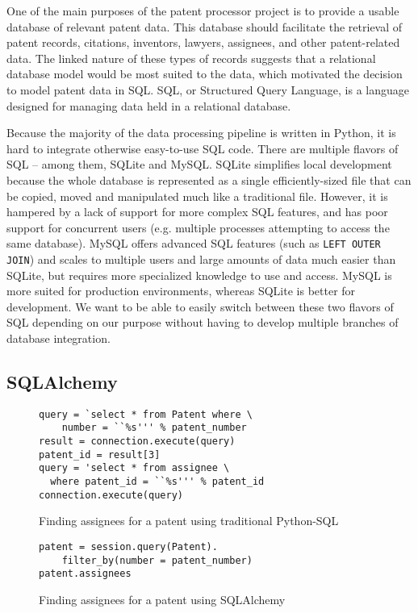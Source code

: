 One of the main purposes of the patent processor project is to provide
a usable database of relevant patent data. This database should facilitate
the retrieval of patent records, citations, inventors, lawyers, assignees,
and other patent-related data. The linked nature of these types of
records suggests that a relational database model would be most suited
to the data, which motivated the decision to model patent data in
SQL. SQL, or Structured Query Language, is a language designed for
managing data held in a relational database.

Because the majority of the data processing pipeline is written in
Python, it is hard to integrate otherwise easy-to-use SQL code. There
are multiple flavors of SQL -- among them, SQLite and MySQL. SQLite
simplifies local development because the whole database is represented
as a single efficiently-sized file that can be copied, moved and manipulated
much like a traditional file. However, it is hampered by a lack of
support for more complex SQL features, and has poor support for concurrent
users (e.g. multiple processes attempting to access the same database).
MySQL offers advanced SQL features (such as \verb`LEFT OUTER JOIN`)
and scales to multiple users and large amounts of data much easier
than SQLite, but requires more specialized knowledge to use and access.
MySQL is more suited for production environments, whereas SQLite is
better for development. We want to be able to easily switch between
these two flavors of SQL depending on our purpose without having to
develop multiple branches of database integration.


\subsection{SQLAlchemy}

\begin{figure*}
\begin{lstlisting}
query = `select * from Patent where \
    number = ``%s''' % patent_number
result = connection.execute(query)
patent_id = result[3]
query = 'select * from assignee \
  where patent_id = ``%s''' % patent_id
connection.execute(query)
\end{lstlisting}
 \label{fig:sql-assignee} \caption{Finding assignees for a patent using traditional Python-SQL}
\end{figure*}
\begin{figure*}
\begin{lstlisting}
patent = session.query(Patent).
    filter_by(number = patent_number)
patent.assignees
\end{lstlisting}
 \label{fig:sa-assignee} \caption{Finding assignees for a patent using SQLAlchemy}
\end{figure*}


